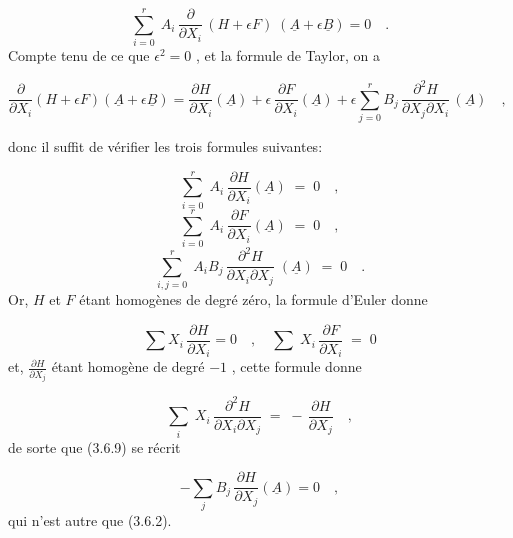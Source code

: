 \begin{equation}\tag{3.6.5}
\sum_{i=0}^{r} \; A_i \, \frac{\partial}{\partial X_i} \, (H+\epsilon F) \; (\underline{A}+\epsilon\underline{B}) = 0 \quad .
\end{equation}
Compte tenu de ce que $\epsilon^2 = 0$ , et la formule de Taylor, on a

\begin{equation}\tag{3.6.6}
\frac{\partial}{\partial X_i}(H+\epsilon F)(\underline{A}+\epsilon\underline{B}) = \frac{\partial H}{\partial X_i}(\underline{A})+\epsilon \, \frac{\partial F}{\partial X_i}(\underline{A})+\epsilon \sum_{j=0}^{r} B_j \, \frac{\partial^2 H}{\partial X_j \partial X_i} \, (\underline{A}) \quad , \quad 
\end{equation}


 donc il suffit de vérifier les trois formules suivantes:

\begin{equation}\tag{3.6.7}
\sum_{i=0}^{r} \; A_i \, \frac{\partial H}{\partial X_i}(\underline{A}) \;=\; 0 \quad ,
\end{equation}
\begin{equation}\tag{3.6.8}
\sum_{i=0}^{r} \; A_i \, \frac{\partial F}{\partial X_i}(\underline{A}) \;=\; 0 \quad ,
\end{equation}
\begin{equation}\tag{3.6.9}
\sum_{i,j=0}^{r} \; A_i B_j \, \frac{\partial^2 H}{\partial X_i \partial X_j} \; (\underline{A}) \;=\; 0 \quad .
\end{equation}
Or, $H$ et $F$ étant homogènes de degré zéro, la formule d'Euler donne

\begin{equation}\tag{3.6.10}
\sum X_i \, \frac{\partial H}{\partial X_i} = 0 \quad , \quad \sum \; X_i \, \frac{\partial F}{\partial X_i} \;=\; 0
\end{equation}
et, $\frac{\partial H}{\partial X_j}$ étant homogène de degré $-1$ , cette formule donne

\begin{equation*}
\sum_i \; X_i \, \frac{\partial^2 H}{\partial X_i \partial X_j} \;=\; - \, \frac{\partial H}{\partial X_j} \quad ,
\end{equation*}
de sorte que (3.6.9) se récrit

\begin{equation}\tag{3.6.11}
- \sum_j B_j \, \frac{\partial H}{\partial X_j}(\underline{A}) = 0 \quad ,
\end{equation}
qui n'est autre que (3.6.2).

